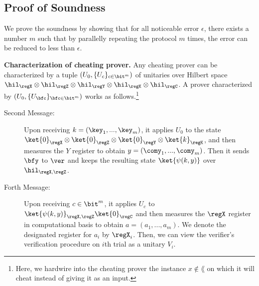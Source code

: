 \subsection{Proof of Soundness}

We prove the soundness by showing that for all noticeable error $\epsilon$, there exists a number $m$ such that by parallelly repeating the protocol $m$ times, the error can be reduced to less than $\epsilon$. 

\noindent\textbf{Characterization of cheating prover.}
Any cheating prover can be characterized by a tuple $(U_0,\{U_c\}_{c\in \bit^m})$ of unitaries over Hilbert space $\hil_{\regX}\otimes \hil_{\regZ} \otimes \hil_{\regY}  \otimes \hil_{\regK}\otimes \hil_{\regC} $. 
A prover characterized by $(U_0,\{U_{\bfc}\}_{\bfc\in \bit^m})$ works as follows.\footnote{Here, we hardwire into the cheating prover the instance $x\notin \lang$ on which it will cheat instead of giving it as an input.}
\begin{description}
\item[Second Message:] Upon receiving $k=(\key_1,...,\key_m)$, it applies $U_0$ to the state $\ket{0}_{\regX}\otimes\ket{0}_{\regZ}\otimes\ket{0}_{\regY}\otimes  \ket{k}_{\regK}$, and then measures the $Y$ register to obtain $y=(\comy_1,...,\comy_m)$. Then it sends $\bfy$ to $\ver$ and keeps the resulting state $\ket{\psi(k,y)}$ over  $\hil_{\regX,\regZ}$.
\item [Forth Message:] Upon receiving $c\in \bit^{m}$, it applies $U_c$ to $\ket{\psi(k,y)}_{\regX,\regZ}\ket{0}_{\regC}$ and then measures the $\regX$ register in computational basis to obtain $a=(a_1,...,a_m)$. We denote the designated register for $a_i$ by $\regX_i$. Then, we can view the verifier's verification procedure on $i$th trial as a unitary $V_i$. 
\end{description}


